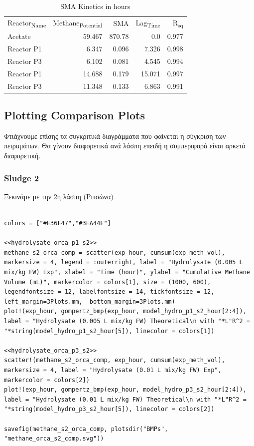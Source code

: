 \documentclass[11pt]{article}
\begin{document}
\begin{table}[htbp]
\caption{SMA Kinetics in hours}
\centering
\begin{tabular}{lrrrr}
Reactor\textsubscript{Name} & Methane\textsubscript{Potential} & SMA & Lag\textsubscript{Time} & R\textsubscript{sq}\\[0pt]
Acetate & 59.467 & 870.78 & 0.0 & 0.977\\[0pt]
Reactor P1 & 6.347 & 0.096 & 7.326 & 0.998\\[0pt]
Reactor P3 & 6.102 & 0.081 & 4.545 & 0.994\\[0pt]
Reactor P1 & 14.688 & 0.179 & 15.071 & 0.997\\[0pt]
Reactor P3 & 11.348 & 0.133 & 6.863 & 0.991\\[0pt]
\end{tabular}
\end{table}

\subsection{Plotting Comparison Plots}
\label{sec:orgea88fcb}
Φτιάχνουμε επίσης τα συγκριτικά διαγράμματα που φαίνεται η σύγκριση των πειραμάτων. Θα γίνουν διαφορετικά ανά λάσπη επειδή η συμπεριφορά είναι αρκετά διαφορετική.
\subsubsection{Sludge 2}
\label{sec:orgd6c581c}
Ξεκινάμε με την 2η λάσπη (Ριτσώνα)

\begin{verbatim}

colors = ["#E36F47","#3EA44E"]

<<hydrolysate_orca_p1_s2>>
methane_s2_orca_comp = scatter(exp_hour, cumsum(exp_meth_vol), markersize = 4, legend = :outerright, label = "Hydrolysate (0.005 L mix/kg FW) Exp", xlabel = "Time (hour)", ylabel = "Cumulative Methane Volume (mL)", markercolor = colors[1], size = (1000, 600), legendfontsize = 12, labelfontsize = 14, tickfontsize = 12, left_margin=3Plots.mm,  bottom_margin=3Plots.mm)
plot!(exp_hour, gompertz_bmp(exp_hour, model_hydro_p1_s2_hour[2:4]), label = "Hydrolysate (0.005 L mix/kg FW) Theoretical\n with "*L"R^2 = "*string(model_hydro_p1_s2_hour[5]), linecolor = colors[1])

<<hydrolysate_orca_p3_s2>>
scatter!(methane_s2_orca_comp, exp_hour, cumsum(exp_meth_vol), markersize = 4, label = "Hydrolysate (0.01 L mix/kg FW) Exp", markercolor = colors[2])
plot!(exp_hour, gompertz_bmp(exp_hour, model_hydro_p3_s2_hour[2:4]), label = "Hydrolysate (0.01 L mix/kg FW) Theoretical\n with "*L"R^2 = "*string(model_hydro_p3_s2_hour[5]), linecolor = colors[2])

savefig(methane_s2_orca_comp, plotsdir("BMPs", "methane_orca_s2_comp.svg"))
\end{verbatim}
\end{document}
